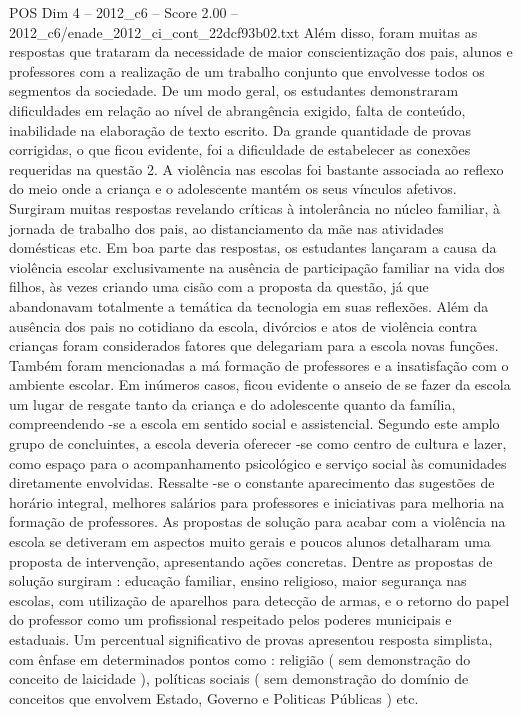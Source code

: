 \begin{textsample}{POS Dim 4 – 2012\_c6 – Score 2.00 – 2012\_c6/enade\_2012\_ci\_cont\_22dcf93b02.txt}
Além disso, foram muitas as respostas que trataram da necessidade de maior conscientização dos pais, alunos e professores com a realização de um trabalho conjunto que envolvesse todos os segmentos da sociedade.
De um modo geral, os estudantes demonstraram dificuldades em relação ao nível de abrangência exigido, falta de conteúdo, inabilidade na elaboração de texto escrito.
Da grande quantidade de provas corrigidas, o que ficou evidente, foi a dificuldade de estabelecer as conexões requeridas na questão 2.
A violência nas escolas foi bastante associada ao reflexo do meio onde a criança e o adolescente mantém os seus vínculos afetivos.
Surgiram muitas respostas revelando críticas à intolerância no núcleo familiar, à jornada de trabalho dos pais, ao distanciamento da mãe nas atividades domésticas etc.
Em boa parte das respostas, os estudantes lançaram a causa da violência escolar exclusivamente na ausência de participação familiar na vida dos filhos, às vezes criando uma cisão com a proposta da questão, já que abandonavam totalmente a temática da tecnologia em suas reflexões.
Além da ausência dos pais no cotidiano da escola, divórcios e atos de violência contra crianças foram considerados fatores que delegariam para a escola novas funções.
Também foram mencionadas a má formação de professores e a insatisfação com o ambiente escolar.
Em inúmeros casos, ficou evidente o anseio de se fazer da escola um lugar de resgate tanto da criança e do adolescente quanto da família, compreendendo -se a escola em sentido social e assistencial.
Segundo este amplo grupo de concluintes, a escola deveria oferecer -se como centro de cultura e lazer, como espaço para o acompanhamento psicológico e serviço social às comunidades diretamente envolvidas.
Ressalte -se o constante aparecimento das sugestões de horário integral, melhores salários para professores e iniciativas para melhoria na formação de professores.
As propostas de solução para acabar com a violência na escola se detiveram em aspectos muito gerais e poucos alunos detalharam uma proposta de intervenção, apresentando ações concretas.
Dentre as propostas de solução surgiram : educação familiar, ensino religioso, maior segurança nas escolas, com utilização de aparelhos para detecção de armas, e o retorno do papel do professor como um profissional respeitado pelos poderes municipais e estaduais.
Um percentual significativo de provas apresentou resposta simplista, com ênfase em determinados pontos como : religião ( sem demonstração do conceito de laicidade ), políticas sociais ( sem demonstração do domínio de conceitos que envolvem Estado, Governo e Politicas Públicas ) etc.

\end{textsample}

